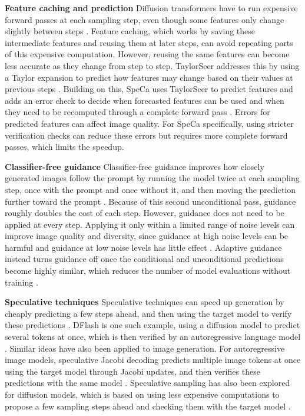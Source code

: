 \documentclass[12pt,letterpaper]{article}
\begin{document}
\textbf{Feature caching and prediction}
Diffusion transformers have to run expensive forward passes at each sampling step, even though some features only change slightly between steps \citep{selvaraju2024forafastforwardcachingdiffusion}. Feature caching, which works by saving these intermediate features and reusing them at later steps, can avoid repeating parts of this expensive computation. However, reusing the same features can become less accurate as they change from step to step. TaylorSeer addresses this by using a Taylor expansion to predict how features may change based on their values at previous steps \citep{Liu_2025_ICCV}. Building on this, SpeCa uses TaylorSeer to predict features and adds an error check to decide when forecasted features can be used and when they need to be recomputed through a complete forward pass
\citep{Liu_2025}.  Errors for predicted features can  affect image quality. For SpeCa specifically, using stricter verification checks can reduce these errors but requires more complete forward passes, which limits the speedup.

\textbf{Classifier-free guidance}
Classifier-free guidance improves how closely generated images follow the prompt by running the model twice at each sampling step, once with the prompt and once without it, and then moving the prediction further toward the prompt \citep{ho2022classifierfreediffusionguidance}. Because of this second unconditional pass, guidance roughly doubles the cost of each step. However, guidance does not need to be applied at every step. Applying it only within a limited range of noise levels can improve image quality and diversity, since guidance at high noise levels can be harmful and guidance at low noise levels has little effect \citep{kynkaanniemi2024applyingguidancelimitedinterval}. Adaptive guidance instead turns guidance off once the conditional and unconditional predictions become highly similar, which reduces the number of model evaluations without training \citep{castillo2023adaptiveguidancetrainingfreeacceleration}.

\textbf{Speculative techniques} Speculative techniques can speed up generation by cheaply predicting a few steps ahead, and then using the target model to verify these predictions \citep{pmlr-v202-leviathan23a}. DFlash is one such example, using a diffusion model to predict several tokens at once, which is then verified by an autoregressive language model \citep{chen2026dflashblockdiffusionflash}. Similar ideas have also been applied to image generation. For autoregressive image models, speculative Jacobi decoding predicts multiple image tokens at once using the  target model through Jacobi updates, and then verifies these predictions with the same model \citep{teng2025acceleratingautoregressivetexttoimagegeneration}. Speculative sampling has also been explored for diffusion models, which is based on using less expensive computations to propose a few sampling steps ahead and checking them with the target model
\citep{debortoli2025accelerateddiffusionmodelsspeculative}.
\end{document}
